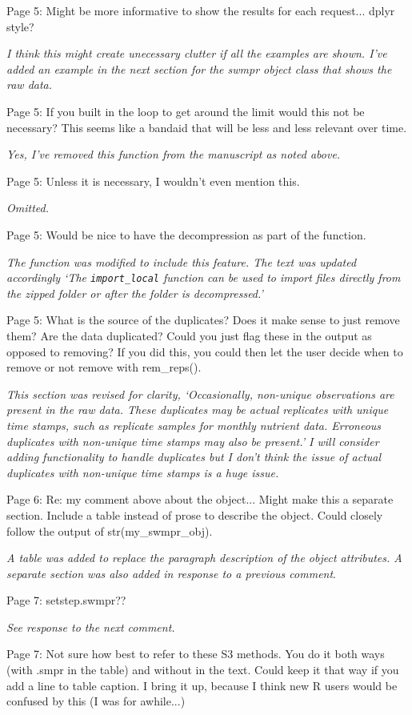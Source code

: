 \documentclass[letterpaper,12pt]{article}\usepackage[]{graphicx}\usepackage[]{color}
\begin{document}
Page 5: Might be more informative to show the results for each request... dplyr style?

{\it I think this might create unecessary clutter if all the examples are shown.  I've added an example in the next section for the swmpr object class that shows the raw data.}

Page 5: If you built in the loop to get around the limit would this not be necessary? This seems like a bandaid that will be less and less relevant over time.

{\it Yes, I've removed this function from the manuscript as noted above.}

Page 5: Unless it is necessary, I wouldn't even mention this.

{\it Omitted.}

Page 5: Would be nice to have the decompression as part of the function.

{\it The function was modified to include this feature.  The text was updated accordingly `The \texttt{import\_local} function can be used to import files directly from the zipped folder or after the folder is decompressed.'}

Page 5: What is the source of the duplicates? Does it make sense to just remove them? Are the data duplicated? Could you just flag these in the output as opposed to removing? If you did this, you could then let the user decide when to remove or not remove with rem\_reps().

{\it This section was revised for clarity, `Occasionally, non-unique observations are present in the raw data.  These duplicates may be actual replicates with unique time stamps, such as replicate samples for monthly nutrient data.  Erroneous duplicates with non-unique time stamps may also be present.'  I will consider adding functionality to handle duplicates but I don't think the issue of actual duplicates with non-unique time stamps is a huge issue.}

Page 6: Re: my comment above about the object... Might make this a separate section. Include a table instead of prose to describe the object. Could closely follow the output of str(my\_swmpr\_obj).

{\it A table was added to replace the paragraph description of the object attributes.  A separate section was also added in response to a previous comment}.

Page 7: setstep.swmpr??

{\it See response to the next comment.}

Page 7: Not sure how best to refer to these S3 methods. You do it both ways (with .smpr in the table) and without in the text. Could keep it that way if you add a line to table caption. I bring it up, because I think new R users would be confused by this (I was for awhile...)
\end{document}
